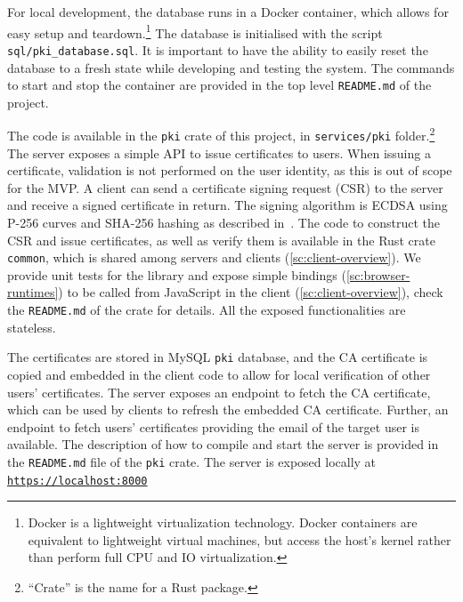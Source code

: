 For local development, 
the database runs in a Docker container, which allows
for easy setup and teardown.\footnote{Docker is a lightweight virtualization technology. Docker containers are equivalent to lightweight virtual machines, but access the host's kernel rather than perform full CPU and IO virtualization.} 
The database is initialised with the script \texttt{sql/pki\_database.sql}.
It is important to have the ability
to easily reset the database to a fresh state 
while developing and testing the system.
The commands to start and stop the container are provided
in the top level \texttt{README.md} of the project.

The code is available in the \texttt{pki} crate
of this project, in \texttt{services/pki} folder.\footnote{``Crate'' is the name for a Rust package.}
The server exposes a simple API
to issue certificates to users. 
When issuing a certificate, validation is not performed
on the user identity, as this is out of scope for the MVP.
A client can send a certificate signing request (CSR)
to the server and receive a signed certificate in return.
The signing algorithm is ECDSA using P-256 curves and SHA-256 hashing
as described in~\cite{rfc5758}.
The code to construct the CSR and issue certificates, as well as 
verify them is available in the Rust crate \texttt{common},
which is shared among servers and clients (\cref{sc:client-overview}).
We provide unit tests for the library and expose simple bindings (\cref{sc:browser-runtimes}) to be
called from JavaScript in the client (\cref{sc:client-overview}), check the \texttt{README.md}
of the crate for details. All the exposed functionalities are stateless.

The certificates are stored in MySQL \texttt{pki} database, and the CA
certificate is copied and embedded in the client code to allow
for local verification of other users' certificates.
The server exposes an endpoint to fetch the
CA certificate, which can be used by clients to
refresh the embedded CA certificate.
Further, an endpoint to fetch users' certificates providing the email of the target user is available.
The description of how to compile and start the server is
provided in the \texttt{README.md} file of the \texttt{pki} crate.
The server is exposed locally at \texttt{\url{https://localhost:8000}}



